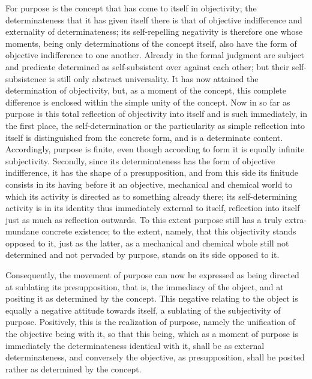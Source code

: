 For purpose is the concept that
has come to itself in objectivity;
the determinateness that it has given itself
there is that of objective indifference
and externality of determinateness;
its self-repelling negativity is
therefore one whose moments,
being only determinations of the concept itself,
also have the form of objective indifference to one another.
Already in the formal judgment are subject and predicate
determined as self-subsistent over against each other;
but their self-subsistence is still only abstract universality.
It has now attained the determination of objectivity,
but, as a moment of the concept,
this complete difference is
enclosed within the simple unity of the concept.
Now in so far as purpose is this total reflection of
objectivity into itself
and is such immediately,
in the first place,
the self-determination
or the particularity as
simple reflection into itself is
distinguished from the concrete form,
and is a determinate content.
Accordingly, purpose is finite,
even though according to form
it is equally infinite subjectivity.
Secondly, since its determinateness has
the form of objective indifference,
it has the shape of a presupposition,
and from this side its finitude consists
in its having before it an objective,
mechanical and chemical world to which
its activity is directed
as to something already there;
its self-determining activity is in its identity
thus immediately external to itself,
reflection into itself just as much as reflection outwards.
To this extent purpose still has a truly
extra-mundane concrete existence;
to the extent, namely, that this objectivity stands opposed to it,
just as the latter, as a mechanical and chemical whole
still not determined and not pervaded by purpose,
stands on its side opposed to it.

Consequently, the movement of purpose can now be expressed
as being directed at sublating its presupposition,
that is, the immediacy of the object,
and at positing it as determined by the concept.
This negative relating to the object is
equally a negative attitude towards itself,
a sublating of the subjectivity of purpose.
Positively, this is the realization of purpose,
namely the unification of the objective being with it,
so that this being, which as a moment of purpose is
immediately the determinateness identical with it,
shall be as external determinateness,
and conversely the objective, as presupposition,
shall be posited rather as determined by the concept.

